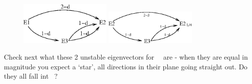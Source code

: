 \begin{figure}[t] \label{f:KS22cage}
\begin{center}
\includegraphics[width=0.4\textwidth]{figs/ks22_E1_UM_diag.eps}
\includegraphics[width=0.4\textwidth]{figs/ks22_E2_UM_diag.eps}
\end{center}
\caption{
        }
\end{figure}



Check next what these 2 unstable eigenvectors for ~\eqv\ are - when they
are equal in magnitude you expect a `star', all directions in their plane
going straight out. Do they all fall int ~\eqv?

